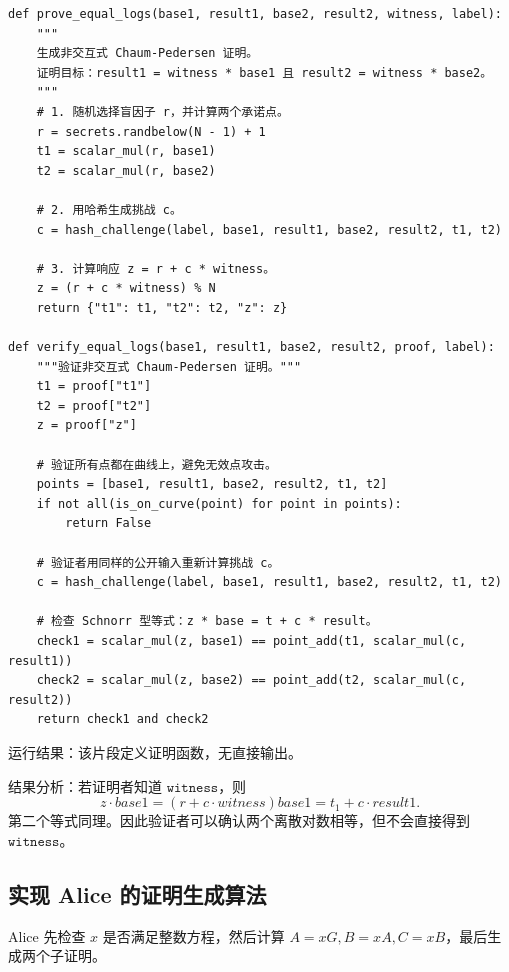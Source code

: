 \documentclass[a4paper]{article}
\begin{document}
	\begin{lstlisting}[caption={Chaum-Pedersen 证明生成与验证}]
def prove_equal_logs(base1, result1, base2, result2, witness, label):
    """
    生成非交互式 Chaum-Pedersen 证明。
    证明目标：result1 = witness * base1 且 result2 = witness * base2。
    """
    # 1. 随机选择盲因子 r，并计算两个承诺点。
    r = secrets.randbelow(N - 1) + 1
    t1 = scalar_mul(r, base1)
    t2 = scalar_mul(r, base2)

    # 2. 用哈希生成挑战 c。
    c = hash_challenge(label, base1, result1, base2, result2, t1, t2)

    # 3. 计算响应 z = r + c * witness。
    z = (r + c * witness) % N
    return {"t1": t1, "t2": t2, "z": z}

def verify_equal_logs(base1, result1, base2, result2, proof, label):
    """验证非交互式 Chaum-Pedersen 证明。"""
    t1 = proof["t1"]
    t2 = proof["t2"]
    z = proof["z"]

    # 验证所有点都在曲线上，避免无效点攻击。
    points = [base1, result1, base2, result2, t1, t2]
    if not all(is_on_curve(point) for point in points):
        return False

    # 验证者用同样的公开输入重新计算挑战 c。
    c = hash_challenge(label, base1, result1, base2, result2, t1, t2)

    # 检查 Schnorr 型等式：z * base = t + c * result。
    check1 = scalar_mul(z, base1) == point_add(t1, scalar_mul(c, result1))
    check2 = scalar_mul(z, base2) == point_add(t2, scalar_mul(c, result2))
    return check1 and check2
	\end{lstlisting}
	
	运行结果：该片段定义证明函数，无直接输出。
	
	结果分析：若证明者知道 \(\texttt{witness}\)，则
	\[
		z\cdot base1=(r+c\cdot witness)base1=t_1+c\cdot result1.
	\]
	第二个等式同理。因此验证者可以确认两个离散对数相等，但不会直接得到 \(\texttt{witness}\)。
	
	\subsection{实现 Alice 的证明生成算法}
	Alice 先检查 \(x\) 是否满足整数方程，然后计算 \(A=xG,B=xA,C=xB\)，最后生成两个子证明。
	
\end{document}
